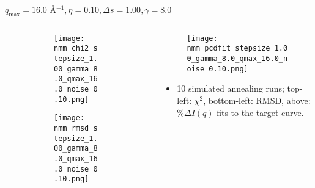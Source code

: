 \documentclass{beamer}
\begin{document}
\begin{frame}{$ q_{\textrm{max}}=16.0 $ \AA $^{-1}, \eta=0.10, \Delta s=1.00, \gamma=8.0$}
	\begin{columns}
		\begin{column}{.5\textwidth}
			\begin{figure}[H]
			\centering
			\begin{subfigure}[b]{\textwidth}
				\centering
				\texttt{[image: nmm\_chi2\_stepsize\_1.00\_gamma\_8.0\_qmax\_16.0\_noise\_0.10.png]}
				\label{fig:}
			\end{subfigure}
			\begin{subfigure}[b]{\textwidth}
				\centering
				\texttt{[image: nmm\_rmsd\_stepsize\_1.00\_gamma\_8.0\_qmax\_16.0\_noise\_0.10.png]}
				\label{fig:}
			\end{subfigure}
			\end{figure}
		\end{column}
		\begin{column}{.5\textwidth}
			\begin{figure}[H]
				\centering
				\texttt{[image: nmm\_pcdfit\_stepsize\_1.00\_gamma\_8.0\_qmax\_16.0\_noise\_0.10.png]}
				\label{fig:}
			\end{figure}
			\begin{itemize}
				\item 10 simulated annealing runs; top-left: $\chi^2$, bottom-left: RMSD, above: $\%\Delta I(q)$ fits to the target curve.
			\end{itemize}
		\end{column}
	\end{columns}
\end{frame}
 
\end{document}
